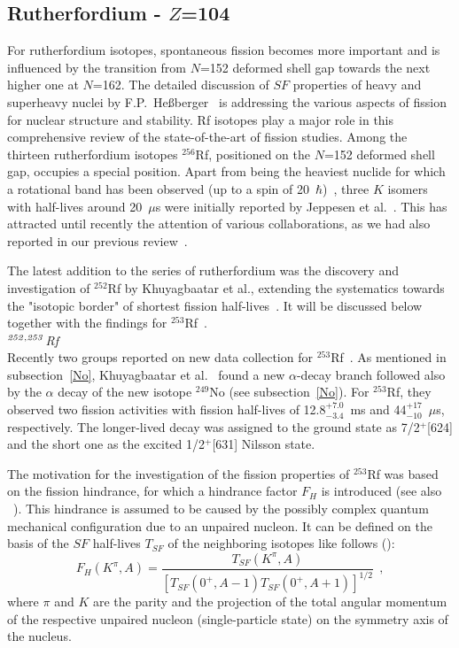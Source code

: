 \subsection{Rutherfordium - $Z$=104}\label{Rf}

For rutherfordium isotopes, spontaneous fission becomes more important and is influenced by the transition from $N$=152 deformed shell gap towards the next higher one at $N$=162. 
The detailed discussion of $SF$ properties of heavy and superheavy nuclei by F.P.~He{\ss}berger~\cite{Hessberger2017} is addressing the various aspects of fission for nuclear structure and stability.
Rf isotopes play a major role in this comprehensive review of the state-of-the-art of fission studies.
Among the thirteen rutherfordium isotopes $^{256}$Rf, positioned on the $N$=152 deformed shell gap, occupies a special position. 
Apart from being the heaviest nuclide for which a rotational band has been observed (up to a spin of 20~$\hbar$)~\cite{Greenlees2012}, three $K$ isomers with half-lives around 20~$\mu$s were initially reported by Jeppesen et al.~\cite{Jeppesen2009}. 
This has attracted until recently the attention of various collaborations, as we had also reported in our previous review~\cite{Ackermann2017}.

The latest addition to the series of rutherfordium was the discovery and investigation of $^{252}$Rf  by Khuyagbaatar et al., extending the systematics towards the "isotopic border" of shortest fission half-lives~\cite{Khuyagbaatar2025}. It will be discussed below together with the findings for $^{253}$Rf~\cite{Lopez-Martens2022,Khuyagbaatar2021}.\\

{\it $^{\it252,253}$Rf}\\ 
Recently two groups reported on new data collection for $^{253}$Rf~\cite{Khuyagbaatar2021,Lopez-Martens2022}. 
As mentioned in subsection~\ref{No}, Khuyagbaatar et al.~\cite{Khuyagbaatar2021} found a new $\alpha$-decay branch followed also by the $\alpha$ decay of the new isotope $^{249}$No (see subsection~\ref{No}). 
For $^{253}$Rf, they observed two fission activities with fission half-lives of 12.8$^{+7.0}_{-3.4}$~ms and 44$^{+17}_{-10}$~$\mu$s, respectively. 
The longer-lived decay was assigned to the ground state as 7/2$^+$[624] and the short one as the excited 1/2$^+$[631] Nilsson state.

The motivation for the investigation of the fission properties of $^{253}$Rf was based on the fission hindrance, for which a hindrance factor $F_H$ is introduced (see also ~\cite{Hessberger2017}).
This hindrance is assumed to be caused by the possibly complex quantum mechanical configuration due to an unpaired nucleon.
It can be defined on the basis of the $SF$ half-lives $T_{SF}$ of the neighboring isotopes like follows (\cite{Khuyagbaatar2021}):
\begin{equation}\label{Eqn:EH_SF}
	F_H (K^\pi,A) = \frac{T_{SF} (K^\pi,A)}
				      {[T_{SF}(0^+,A-1)T_{SF} (0^+, A+1)]^{1/2}} ~~,
\end{equation}
where $\pi$ and $K$ are the parity and the projection of the total angular momentum of the respective unpaired nucleon (single-particle state) on the symmetry axis of the nucleus.	


